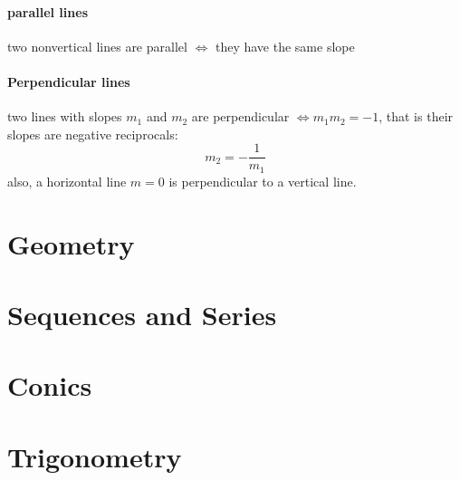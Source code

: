 \documentclass[a4paper,11pt]{book}
\begin{document}
\subsubsection{parallel lines}
two nonvertical lines are parallel $\iff$ they have the same slope
\subsubsection{Perpendicular lines}
two lines with slopes $m_1$ and $m_2$ are perpendicular $\iff m_1m_2=-1$, that is their slopes are negative reciprocals: $$ m_2 = -\frac{1}{m_1}$$ also, a horizontal line $m=0$ is perpendicular to a vertical line.
\chapter{Geometry}
\chapter{Sequences and Series}
\chapter{Conics}
\chapter{Trigonometry}
\end{document}
